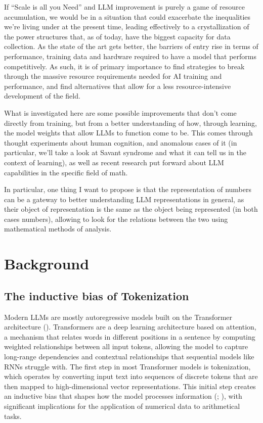 \documentclass[
  a4paper, twoside, 10pt, titlepage]{book}
\begin{document}
If ``Scale is all you Need'' and LLM improvement is purely a game of
resource accumulation, we would be in a situation that could exacerbate
the inequalities we're living under at the present time, leading
effectively to a crystallization of the power structures that, as of
today, have the biggest capacity for data collection. As the state of
the art gets better, the barriers of entry rise in terms of performance,
training data and hardware required to have a model that performs
competitively. As such, it is of primary importance to find strategies
to break through the massive resource requirements needed for AI
training and performance, and find alternatives that allow for a less
resource-intensive development of the field.

What is investigated here are some possible improvements that don't come
directly from training, but from a better understanding of how, through
learning, the model weights that allow LLMs to function come to be. This
comes through thought experiments about human cognition, and anomalous
cases of it (in particular, we'll take a look at Savant syndrome and
what it can tell us in the context of learning), as well as recent
research put forward about LLM capabilities in the specific field of
math.

In particular, one thing I want to propose is that the representation of
numbers can be a gateway to better understanding LLM representations in
general, as their object of representation is the same as the object
being represented (in both cases numbers), allowing to look for the
relations between the two using mathematical methods of analysis.

\chapter{Background}\label{background}

\section{The inductive bias of
Tokenization}\label{the-inductive-bias-of-tokenization}

Modern LLMs are mostly autoregressive models built on the Transformer
architecture ().
Transformers are a deep learning architecture based on attention, a
mechanism that relates words in different positions in a sentence by
computing weighted relationships between all input tokens, allowing the
model to capture long-range dependencies and contextual relationships
that sequential models like RNNs struggle with. The first step in most
Transformer models is tokenization, which operates by converting input
text into sequences of discrete tokens that are then mapped to
high-dimensional vector representations. This initial step creates an
inductive bias that shapes how the model processes information
(;
), with significant
implications for the application of numerical data to arithmetical
tasks.
\end{document}
